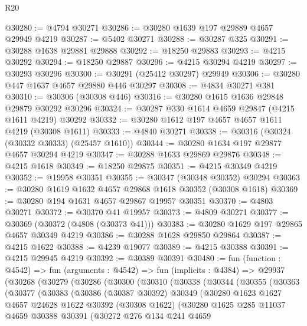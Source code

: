\begin{lexlean}{R20}
\begin{coremodule}
@30280 := @4794 @30271
@30286 := @30280 @1639 @197 @29889 @4657 @29949 @4219
@30287 := @5402 @30271
@30288 := @30287 @325
@30291 := @30288 @1638 @29881 @29888
@30292 := @18250 @29883
@30293 := @4215 @30292
@30294 := @18250 @29887
@30296 := @4215 @30294 @4219
@30297 := @30293 @30296
@30300 := @30291 (@25412 @30297) @29949
@30306 := @30280 @447 @1637 @4657 @29880 @446 @30297
@30308 := @4834 @30271 @381
@30310 := @30306 (@30308 @446)
@30316 := @30280 @1615 @1636 @29848 @29879 @30292 @30296
@30324 := @30287 @330 @1614 @4659 @29847 (@4215 @1611 @4219) @30292
@30332 := @30280 @1612 @197 @4657 @4657 @1611 @4219 (@30308 @1611)
@30333 := @4840 @30271
@30338 := @30316 (@30324 (@30332 @30333) (@25457 @1610))
@30344 := @30280 @1634 @197 @29877 @4657 @30294 @4219
@30347 := @30288 @1633 @29869 @29876
@30348 := @4215 @1618
@30349 := @18250 @29875
@30351 := @4215 @30349 @4219
@30352 := @19958 @30351
@30355 := @30347 (@30348 @30352) @30294
@30363 := @30280 @1619 @1632 @4657 @29868 @1618 @30352 (@30308 @1618)
@30369 := @30280 @194 @1631 @4657 @29867 @19957 @30351
@30370 := @4803 @30271
@30372 := @30370 @41 @19957
@30373 := @4809 @30271
@30377 := @30369 (@30372 (@4808 (@30373 @41)))
@30383 := @30280 @1629 @197 @29865 @4657 @30349 @4219
@30386 := @30288 @1628 @29850 @29864
@30387 := @4215 @1622
@30388 := @4239 @19077
@30389 := @4215 @30388
@30391 := @4215 @29945 @4219
@30392 := @30389 @30391
@30480 := fun (function : @4542) =>
  fun (arguments : @4542) =>
  fun (implicits : @4384) =>
  @29937
    (@30268
      (@30279
        (@30286
          (@30300
            (@30310
              (@30338
                (@30344
                  (@30355
                    (@30363
                      (@30377
                        (@30383
                          (@30386
                            (@30387 @30392)
                            @30349
                            (@30280
                              @1623
                              @1627
                              @4657
                              @24628
                              @1622
                              @30392
                              (@30308 @1622)
                              (@30280
                                @1625
                                @285
                                @11037
                                @4659
                                @30388
                                @30391
                                (@30272
                                  @276
                                  @134
                                  @241
                                  @4659

\end{coremodule}
\end{lexlean}
